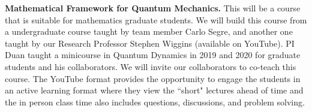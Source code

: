 \documentclass[11pt]{article}
\begin{document}


\medskip
\noindent
{\bf  Mathematical Framework for Quantum Mechanics.} This will be a course that is suitable for mathematics graduate students. We will build this course from  a   undergraduate course   taught by team member Carlo Segre, and another one taught by our Research Professor Stephen Wiggins (available on YouTube). PI Duan   taught a minicourse in Quantum Dynamics \cite{Gutzwiller1990ChaosIC, Holland1993TheQT,Micha2006QuantumDW} in 2019 and 2020 for graduate students and his collaborators.  We will invite our collaborators to co-teach this course. 
The YouTube format provides the opportunity to engage the students in an active learning format where they view the “short" lectures ahead of time and the in person class time  also includes  questions, discussions, and problem solving.
\end{document}
